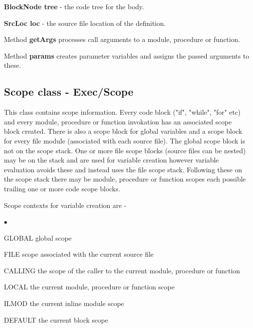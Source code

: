 \documentclass[10pt,a4paper,twoside,fleqn]{book}
\newcommand{\blist}{\begin{list}{$\bullet$}{\setlength{\itemsep}{-5pt}\setlength{\topsep}{-5pt}}}
\newcommand{\blend}{\end{list}}
\begin{document}
            {\bf BlockNode tree} - the code tree for the body.

            {\bf SrcLoc loc} - the source file location of the definition.

            Method {\bf getArgs} processes call arguments to a module, procedure
            or function.
            
            Method {\bf params} creates parameter variables and assigns the passed
            arguments to these.



        \subsection{Scope class - Exec/Scope}\label{scope}

            This class contains scope information. Every code block ("if", "while",
            "for" etc) and every module, procedure or function invokation has an
            associated scope block created. There is also a scope block for global
            variables and a scope block for every file module (associated with each
            source file). The global scope block is not on the scope stack. One or
            more file scope blocks (source files can be nested) may be on the stack
            and are used for variable creation however variable evaluation avoids
            these and instead uses the file scope stack. Following these on the
            scope stack there may be module, procedure or function scopes each
            possible trailing one or more code scope blocks.

            Scope contexts for variable creation are -
            \blist
            \item   GLOBAL  global scope
            \item   FILE    scope associated with the current source file
            \item   CALLING the scope of the caller to the current module,
                            procedure or function
            \item   LOCAL   the current module, procedure or function scope
            \item   ILMOD   the current inline module scope
            \item   DEFAULT the current block scope
            \blend
\end{document}

